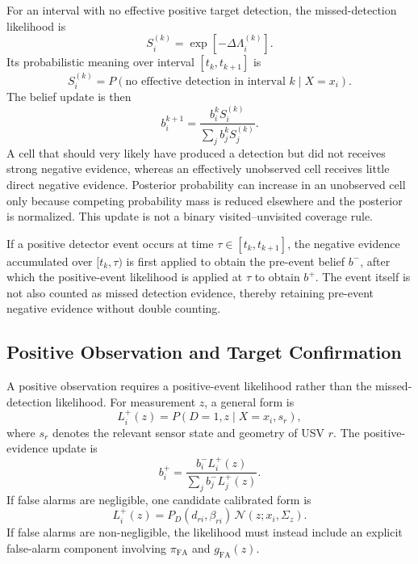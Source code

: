 \documentclass[letterpaper, 10pt, conference]{ieeeconf}
\begin{document}
For an interval with no effective positive target detection, the missed-detection likelihood is
\begin{equation}
  S_i^{(k)} = \exp\!\left[-\Delta\Lambda_i^{(k)}\right].
  \label{eq:miss_likelihood}
\end{equation}
Its probabilistic meaning over interval \([t_k,t_{k+1}]\) is
\begin{equation}
  S_i^{(k)} = P\!\left(\text{no effective detection in interval }k\mid X=x_i\right).
  \label{eq:miss_likelihood_meaning}
\end{equation}
The belief update is then
\begin{equation}
  b_i^{k+1} =
  \frac{b_i^k S_i^{(k)}}{\sum_j b_j^k S_j^{(k)}}.
  \label{eq:negative_bayes}
\end{equation}
A cell that should very likely have produced a detection but did not receives strong negative evidence, whereas an effectively unobserved cell receives little direct negative evidence. Posterior probability can increase in an unobserved cell only because competing probability mass is reduced elsewhere and the posterior is normalized. This update is not a binary visited--unvisited coverage rule.

If a positive detector event occurs at time \(\tau\in[t_k,t_{k+1}]\), the negative evidence accumulated over \([t_k,\tau)\) is first applied to obtain the pre-event belief \(b^-\), after which the positive-event likelihood is applied at \(\tau\) to obtain \(b^+\). The event itself is not also counted as missed detection evidence, thereby retaining pre-event negative evidence without double counting.

\subsection{Positive Observation and Target Confirmation}

A positive observation requires a positive-event likelihood rather than the missed-detection likelihood. For measurement \(z\), a general form is
\begin{equation}
  L_i^+(z) = P\!\left(D=1,z\mid X=x_i,s_r\right),
  \label{eq:positive_likelihood}
\end{equation}
where \(s_r\) denotes the relevant sensor state and geometry of USV \(r\). The positive-evidence update is
\begin{equation}
  b_i^+ = \frac{b_i^- L_i^+(z)}{\sum_j b_j^- L_j^+(z)}.
  \label{eq:positive_bayes}
\end{equation}
If false alarms are negligible, one candidate calibrated form is
\begin{equation}
  L_i^+(z) = P_D(d_{ri},\beta_{ri})\,\mathcal{N}(z;x_i,\Sigma_z).
  \label{eq:positive_likelihood_negligible_fa}
\end{equation}
If false alarms are non-negligible, the likelihood must instead include an explicit false-alarm component involving \(\pi_{\mathrm{FA}}\) and \(g_{\mathrm{FA}}(z)\).
\end{document}
